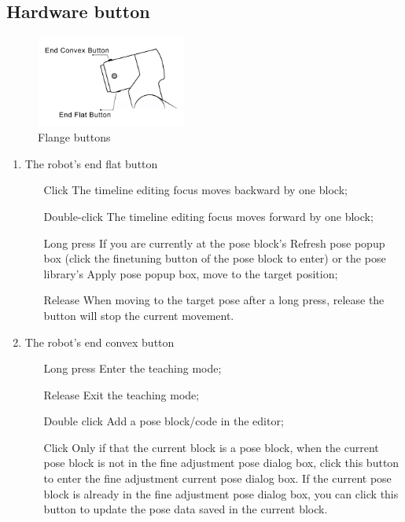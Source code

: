 \subsection{Hardware button}
\label{sec:硬件按钮}

\begin{figure}[ht]
	\centering
	\includegraphics[height=3cm]{en/image/flange_buttons.pdf}
	\caption{Flange buttons}
	\label{fig:末端按钮示意图}
\end{figure}

\begin{enumerate}[label=(\arabic*)]
	\item The robot's end flat button
	\begin{itemize}
		\item[Click] The timeline editing focus moves backward by one block;
		\item[Double-click] The timeline editing focus moves forward by one block;
		\item[Long press] If you are currently at the pose block's Refresh pose pop­up box (click the fine­tuning button of the pose block to enter) or the pose library's Apply pose pop­up box, move to the target position;
		\item[Release] When moving to the target pose after a long press, release the button will stop the current movement.
	\end{itemize}

	\item The robot's end convex button
	\begin{itemize}
		\item[Long press] Enter the teaching mode;
		\item[Release] Exit the teaching mode;
		\item[Double click] Add a pose block/code in the editor;
		\item[Click] Only if that the current block is a pose block, when the current pose block is not in the fine adjustment pose dialog box, click this button to enter the fine adjustment current pose dialog box. If the current pose block is already in the fine adjustment pose dialog box, you can click this button to update the pose data saved in the current block.
	\end{itemize}


\end{enumerate}
